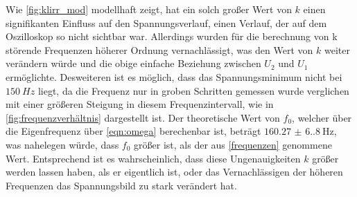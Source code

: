     \noindent Wie \ref{fig:klirr_mod} modellhaft zeigt, hat ein solch großer Wert von $k$ einen signifikanten Einfluss auf den Spannungsverlauf, einen
    Verlauf, der auf dem Oszilloskop so nicht sichtbar war.
    Allerdings wurden für die berechnung von k störende Frequenzen höherer Ordnung vernachlässigt, was den Wert von $k$ weiter
    verändern würde und die obige einfache Beziehung zwischen $U_2$ und $U_1$ ermöglichte. Desweiteren ist es möglich, dass 
    das Spannungsminimum nicht bei $\qty{150}{Hz}$ liegt, da die Frequenz nur in groben Schritten gemessen wurde verglichen mit einer
    größeren Steigung in diesem Frequenzintervall, wie in \ref{fig:frequenzverhältnis} dargestellt ist. Der theoretische Wert von
    $f_0$, welcher über die Eigenfrequenz über \ref{eqn:omega} berechenbar ist, beträgt $\qty{160.27(6.80)}{\hertz}$, was nahelegen würde,
    dass $f_0$ größer ist, als der aus \ref{frequenzen} genommene Wert. Entsprechend ist es wahrscheinlich, dass diese Ungenauigkeiten $k$ größer
    werden lassen haben, als er eigentlich ist, oder das Vernachlässigen der höheren Frequenzen das Spannungsbild zu stark verändert hat.

    \label{sec:Diskussion}
